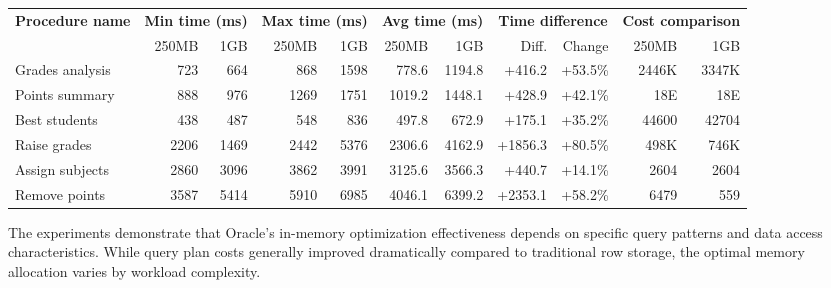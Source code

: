 \begin{table}[htb]
    \centering
    \begin{tabular}{|l||r|r||r|r||r|r||r|r||r|r|}
        \hline
        \multirow{2}{*}{\textbf{Procedure name}} & \multicolumn{2}{c||}{\textbf{Min time (ms)}} & \multicolumn{2}{c||}{\textbf{Max time (ms)}} & \multicolumn{2}{c||}{\textbf{Avg time (ms)}} & \multicolumn{2}{c||}{\textbf{Time difference}} & \multicolumn{2}{c|}{\textbf{Cost comparison}} \\
         & 250MB & 1GB & 250MB & 1GB & 250MB & 1GB & Diff. & Change & 250MB & 1GB \\
        \hline
        Grades analysis & 723 & 664 & 868 & 1598 & 778.6 & 1194.8 & +416.2 & +53.5\% & 2446K & 3347K \\
        Points summary  & 888 & 976 & 1269 & 1751 & 1019.2 & 1448.1 & +428.9 & +42.1\% & 18E & 18E \\
        Best students   & 438 & 487 & 548 & 836 & 497.8 & 672.9 & +175.1 & +35.2\% & 44600 & 42704 \\
        Raise grades    & 2206 & 1469 & 2442 & 5376 & 2306.6 & 4162.9 & +1856.3 & +80.5\% & 498K & 746K \\
        Assign subjects & 2860 & 3096 & 3862 & 3991 & 3125.6 & 3566.3 & +440.7 & +14.1\% & 2604 & 2604 \\
        Remove points   & 3587 & 5414 & 5910 & 6985 & 4046.1 & 6399.2 & +2353.1 & +58.2\% & 6479 & 559 \\
        \hline
    \end{tabular}
\end{table}

The experiments demonstrate that Oracle's in-memory optimization effectiveness depends on specific query patterns and data access characteristics. While query plan costs generally improved dramatically compared to traditional row storage, the optimal memory allocation varies by workload complexity. 